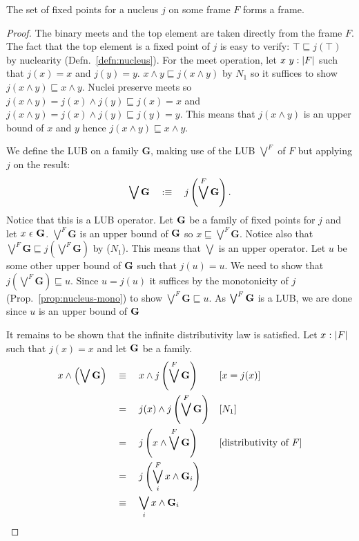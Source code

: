 \begin{thm}\label{thm:fixed-point-frame}
  The set of fixed points for a nucleus $j$ on some frame $F$ forms a frame.
\end{thm}
\begin{proof}
  The binary meets and the top element are taken directly from the frame $F$. The fact
  that the top element is a fixed point of $j$ is easy to verify: $\top \sqsubseteq j(\top)$ by nuclearity
  (Defn.~\ref{defn:nucleus}). For the meet operation, let $x~y:\left| F \right|$ such
  that $j(x) = x$ and $j(y) = y$. $x \wedge y \sqsubseteq j(x \wedge y)$ by $N_1$ so it suffices to show $j(x
  \wedge y) \sqsubseteq x \wedge y$. Nuclei preserve meets so $j(x \wedge y) = j(x) \wedge j(y) \sqsubseteq j(x) = x$ and $j(x \wedge
  y) = j(x) \wedge j(y) \sqsubseteq j(y) = y$. This means that $j(x \wedge y)$ is an upper bound of $x$ and
  $y$ hence $j(x \wedge y) \sqsubseteq x \wedge y$.

  We define the LUB on a family $\mathbf{G}$, making use of the LUB $\bigvee^F$ of $F$ but
  applying $j$ on the result:
  \begin{equation*}
    \bigvee \mathbf{G} \quad:\equiv\quad j \left( \bigvee^F \mathbf{G} \right).
  \end{equation*}
  Notice that this is a LUB operator. Let $\mathbf{G}{}$ be a family of fixed points for $j$ and
  let $x~\epsilon~\mathbf{G}{}$. $\bigvee^F \mathbf{G}$ is an upper bound of $\mathbf{G}{}$ so $x \sqsubseteq \bigvee^F \mathbf{G}$.
  Notice also that $\bigvee^F \mathbf{G} \sqsubseteq j \left( \bigvee^F \mathbf{G} \right)$ by ($N_1$). This
  means that $\bigvee$ is an upper operator. Let $u$ be some other upper bound of $\mathbf{G}{}$ such
  that $j(u) = u$. We need to show that $j \left( \bigvee^F \mathbf{G} \right) \sqsubseteq u$. Since $u =
  j(u)$ it suffices by the monotonicity of $j$ (Prop.~\ref{prop:nucleus-mono}) to show
  $\bigvee^F \mathbf{G} \sqsubseteq u$. As $\bigvee^F \mathbf{G}{}$ is a LUB, we are done since $u$ is an upper bound
  of $\mathbf{G}{}$

  It remains to be shown that the infinite distributivity law is satisfied. Let
  $x\hspace{0.1mm}:\hspace{0.1mm}\left| F \right|$ such that $j(x) = x$ and let $\mathbf{G}{}$ be a family.
  \begin{align*}
    x \wedge \left( \bigvee \mathbf{G}{} \right)
      &\quad\equiv\quad x    \wedge j\left( \bigvee^F \mathbf{G}{} \right)      && [x = j(x)]                     \\
      &\quad=\quad j(x) \wedge j\left( \bigvee^F \mathbf{G}{} \right)      && [N_1]                          \\
      &\quad=\quad j \left( x \wedge \bigvee^F \mathbf{G}{} \right)        && [\text{distributivity of}\ F]  \\
      &\quad=\quad j \left( \bigvee^F_i x \wedge \mathbf{G}{}_i \right)                                      \\
      &\quad\equiv\quad \bigvee_i x \wedge \mathbf{G}{}_i
  \end{align*}
\end{proof}

